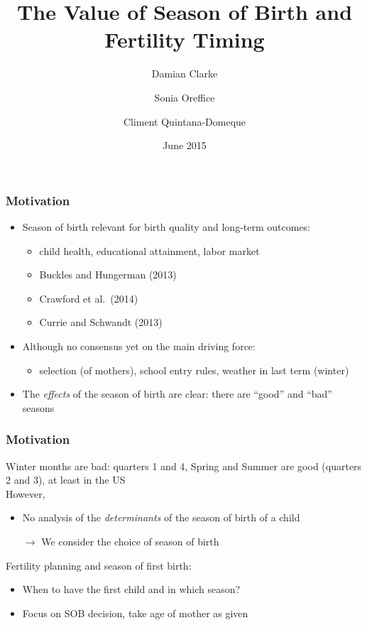 \documentclass[10pt,letterpaper,subeqn]{beamer}
\title{The Value of Season of Birth and Fertility Timing}
\author{Damian Clarke\inst{\dag} 
   \and Sonia Oreffice\inst{\ddag} 
   \and Climent Quintana-Domeque\inst{*}}
\institute{\inst{\dag}  University of Oxford
      \and \inst{\ddag} University of Surrey and IZA 
      \and \inst{*}     University of Oxford and IZA}
\date{June 2015}
\begin{document}
\begin{frame}
\titlepage
\end{frame}

\begin{frame}[label=Motivation]
\frametitle{Motivation}

\begin{itemize}
\item Season of birth relevant for birth quality and long-term outcomes:
      \begin{itemize}
        \item child health, educational attainment, labor market
        \item Buckles and Hungerman (2013)
        \item Crawford et al.\ (2014)
        \item Currie and Schwandt (2013)
      \end{itemize}
\item Although no consensus yet on the main driving force: 
      \begin{itemize}
        \item selection (of mothers), school entry rules, weather in last term (winter)
      \end{itemize}
\item The \emph{effects} of the season of birth are clear: there are ``good'' 
and ``bad'' seasons
\end{itemize}
\end{frame}

\begin{frame}[label=Motivation2]
\frametitle{Motivation}
Winter months are bad: quarters 1 and 4, Spring and Summer are good (quarters 2 
and 3), at least in the US \\ \vspace{4mm}
However,
\begin{itemize}
  \item No analysis of the \emph{determinants} of the season of birth of a child
  \item[$\rightarrow$] We consider the choice of season of birth
\end{itemize}
\vspace{6mm}
Fertility planning and season of first birth: 
\begin{itemize}
  \item When to have the first child and in which season?
  \item Focus on SOB decision, take age of mother as given
\end{itemize}
\end{frame}
\end{document}
